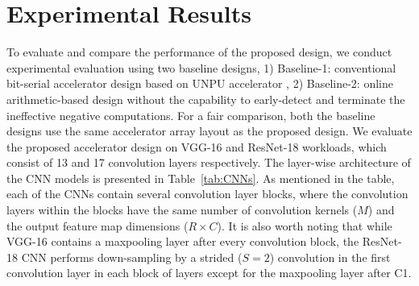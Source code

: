 \documentclass[conference]{IEEEtran}
\begin{document}
\section{Experimental Results} \label{sec: Results}
To evaluate and compare the performance of the proposed design, we conduct experimental evaluation using two baseline designs, 1) Baseline-1: conventional bit-serial accelerator design based on UNPU accelerator \cite{lee2018unpu}, 2) Baseline-2: online arithmetic-based design without the capability to early-detect and terminate the ineffective negative computations. For a fair comparison, both the baseline designs use the same accelerator array layout as the proposed design. We evaluate the proposed accelerator design on VGG-16 \cite{simonyan2014very} and ResNet-18 \cite{he2016deep} workloads, which consist of 13 and 17 convolution layers respectively. The layer-wise architecture of the CNN models is presented in Table~\ref{tab:CNNs}. As mentioned in the table, each of the CNNs contain several convolution layer blocks, where the convolution layers within the blocks have the same number of convolution kernels (\(M\)) and the output feature map dimensions (\(R \times C\)). It is also worth noting that while VGG-16 contains a maxpooling layer after every convolution block, the ResNet-18 CNN performs down-sampling by a strided (\(S=2\)) convolution in the first convolution layer in each block of layers except for the maxpooling layer after C1.
\end{document}
